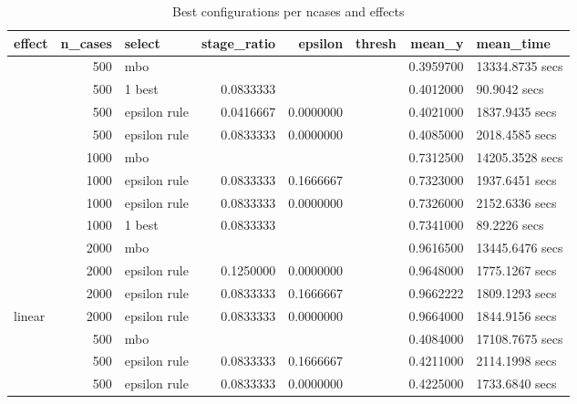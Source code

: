 
\begin{longtable}[t]{lrlrrrrl}
\caption{\label{tab:}Best configurations per ncases and effects}\\
\toprule
effect & n\_cases & select & stage\_ratio & epsilon & thresh & mean\_y & mean\_time\\
\midrule
 & 500 & mbo &  &  &  & 0.3959700 & 13334.8735 secs\\

 & 500 & 1 best & 0.0833333 &  &  & 0.4012000 & 90.9042 secs\\

 & 500 & epsilon rule & 0.0416667 & 0.0000000 &  & 0.4021000 & 1837.9435 secs\\

 & 500 & epsilon rule & 0.0833333 & 0.0000000 &  & 0.4085000 & 2018.4585 secs\\

 & 1000 & mbo &  &  &  & 0.7312500 & 14205.3528 secs\\

 & 1000 & epsilon rule & 0.0833333 & 0.1666667 &  & 0.7323000 & 1937.6451 secs\\

 & 1000 & epsilon rule & 0.0833333 & 0.0000000 &  & 0.7326000 & 2152.6336 secs\\

 & 1000 & 1 best & 0.0833333 &  &  & 0.7341000 & 89.2226 secs\\

 & 2000 & mbo &  &  &  & 0.9616500 & 13445.6476 secs\\

 & 2000 & epsilon rule & 0.1250000 & 0.0000000 &  & 0.9648000 & 1775.1267 secs\\

 & 2000 & epsilon rule & 0.0833333 & 0.1666667 &  & 0.9662222 & 1809.1293 secs\\

\multirow{-12}{*}{\raggedright\arraybackslash linear} & 2000 & epsilon rule & 0.0833333 & 0.0000000 &  & 0.9664000 & 1844.9156 secs\\
\cmidrule{1-8}
 & 500 & mbo &  &  &  & 0.4084000 & 17108.7675 secs\\

 & 500 & epsilon rule & 0.0833333 & 0.1666667 &  & 0.4211000 & 2114.1998 secs\\

 & 500 & epsilon rule & 0.0833333 & 0.0000000 &  & 0.4225000 & 1733.6840 secs\\


\end{longtable}
